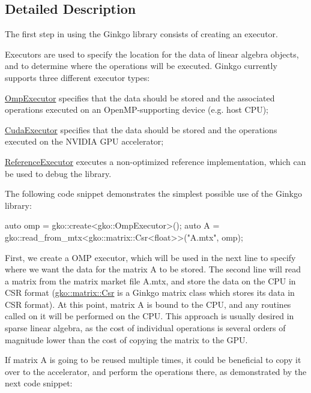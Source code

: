 \subsection{Detailed Description}
The first step in using the Ginkgo library consists of creating an executor. 

Executors are used to specify the location for the data of linear algebra objects, and to determine where the operations will be executed. Ginkgo currently supports three different executor types\+:


\begin{DoxyItemize}
\item \hyperlink{classgko_1_1OmpExecutor}{Omp\+Executor} specifies that the data should be stored and the associated operations executed on an Open\+M\+P-\/supporting device (e.\+g. host C\+PU);
\item \hyperlink{classgko_1_1CudaExecutor}{Cuda\+Executor} specifies that the data should be stored and the operations executed on the N\+V\+I\+D\+IA G\+PU accelerator;
\item \hyperlink{classgko_1_1ReferenceExecutor}{Reference\+Executor} executes a non-\/optimized reference implementation, which can be used to debug the library.
\end{DoxyItemize}

The following code snippet demonstrates the simplest possible use of the Ginkgo library\+:


\begin{DoxyCode}
\textcolor{keyword}{auto} omp = gko::create<gko::OmpExecutor>();
\textcolor{keyword}{auto} A = gko::read\_from\_mtx<gko::matrix::Csr<float>>(\textcolor{stringliteral}{"A.mtx"}, omp);
\end{DoxyCode}


First, we create a O\+MP executor, which will be used in the next line to specify where we want the data for the matrix A to be stored. The second line will read a matrix from the matrix market file \textquotesingle{}A.\+mtx\textquotesingle{}, and store the data on the C\+PU in C\+SR format (\hyperlink{classgko_1_1matrix_1_1Csr}{gko\+::matrix\+::\+Csr} is a Ginkgo matrix class which stores its data in C\+SR format). At this point, matrix A is bound to the C\+PU, and any routines called on it will be performed on the C\+PU. This approach is usually desired in sparse linear algebra, as the cost of individual operations is several orders of magnitude lower than the cost of copying the matrix to the G\+PU.

If matrix A is going to be reused multiple times, it could be beneficial to copy it over to the accelerator, and perform the operations there, as demonstrated by the next code snippet\+:


